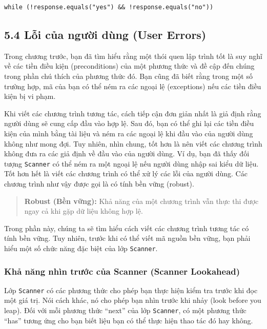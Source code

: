 \begin{verbatim}
while (!response.equals("yes") && !response.equals("no"))
\end{verbatim}

\subsection*{5.4 Lỗi của người dùng (User Errors)}

Trong chương trước, bạn đã tìm hiểu rằng một thói quen lập trình tốt là suy nghĩ về các tiền điều kiện (preconditions) của một phương thức và đề cập đến chúng trong phần chú thích của phương thức đó. Bạn cũng đã biết rằng trong một số trường hợp, mã của bạn có thể ném ra các ngoại lệ (exceptions) nếu các tiền điều kiện bị vi phạm.

Khi viết các chương trình tương tác, cách tiếp cận đơn giản nhất là giả định rằng người dùng sẽ cung cấp đầu vào hợp lệ. Sau đó, bạn có thể ghi lại các tiền điều kiện của mình bằng tài liệu và ném ra các ngoại lệ khi đầu vào của người dùng không như mong đợi. Tuy nhiên, nhìn chung, tốt hơn là nên viết các chương trình không đưa ra các giả định về đầu vào của người dùng. Ví dụ, bạn đã thấy đối tượng \texttt{Scanner} có thể ném ra một ngoại lệ nếu người dùng nhập sai kiểu dữ liệu. Tốt hơn hết là viết các chương trình có thể xử lý các lỗi của người dùng. Các chương trình như vậy được gọi là có tính bền vững (robust).

\begin{quote}
\textbf{Robust (Bền vững):} Khả năng của một chương trình vẫn thực thi được ngay cả khi gặp dữ liệu không hợp lệ.
\end{quote}

Trong phần này, chúng ta sẽ tìm hiểu cách viết các chương trình tương tác có tính bền vững. Tuy nhiên, trước khi có thể viết mã nguồn bền vững, bạn phải hiểu một số chức năng đặc biệt của lớp \texttt{Scanner}.

\subsubsection*{Khả năng nhìn trước của Scanner (Scanner Lookahead)}

Lớp \texttt{Scanner} có các phương thức cho phép bạn thực hiện kiểm tra trước khi đọc một giá trị. Nói cách khác, nó cho phép bạn nhìn trước khi nhảy (look before you leap). Đối với mỗi phương thức ``next'' của lớp \texttt{Scanner}, có một phương thức ``has'' tương ứng cho bạn biết liệu bạn có thể thực hiện thao tác đó hay không.

